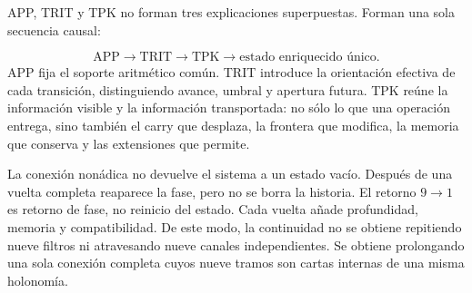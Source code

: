 APP, TRIT y TPK no forman tres explicaciones superpuestas. Forman una sola secuencia causal:\par
\[
\mathrm{APP}
\longrightarrow
\mathrm{TRIT}
\longrightarrow
\mathrm{TPK}
\longrightarrow
\text{estado enriquecido único}.
\]
APP fija el soporte aritmético común. TRIT introduce la orientación efectiva de cada transición, distinguiendo avance, umbral y apertura futura. TPK reúne la información visible y la información transportada: no sólo lo que una operación entrega, sino también el carry que desplaza, la frontera que modifica, la memoria que conserva y las extensiones que permite.\par
La conexión nonádica no devuelve el sistema a un estado vacío. Después de una vuelta completa reaparece la fase, pero no se borra la historia. El retorno \(9\to1\) es retorno de fase, no reinicio del estado. Cada vuelta añade profundidad, memoria y compatibilidad. De este modo, la continuidad no se obtiene repitiendo nueve filtros ni atravesando nueve canales independientes. Se obtiene prolongando una sola conexión completa cuyos nueve tramos son cartas internas de una misma holonomía.\par
{}
